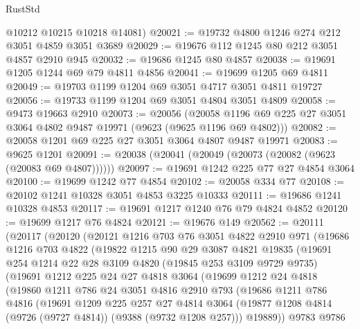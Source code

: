 \begin{lexlean}{RustStd}
\begin{coremodule}
      @10212
      @10215
      @10218
      @14081)
@20021 := @19732 @4800 @1246 @274 @212 @3051 @4859 @3051 @3689
@20029 := @19676 @112 @1245 @80 @212 @3051 @4857 @2910 @945
@20032 := @19686 @1245 @80 @4857
@20038 := @19691 @1205 @1244 @69 @79 @4811 @4856
@20041 := @19699 @1205 @69 @4811
@20049 := @19703 @1199 @1204 @69 @3051 @4717 @3051 @4811 @19727
@20056 := @19733 @1199 @1204 @69 @3051 @4804 @3051 @4809
@20058 := @9473 @19663 @2910
@20073 := @20056
    (@20058 @1196 @69 @225 @27 @3051 @3064 @4802 @9487 @19971 (@9623 (@9625 @1196 @69 @4802)))
@20082 := @20058 @1201 @69 @225 @27 @3051 @3064 @4807 @9487 @19971
@20083 := @9625 @1201
@20091 := @20038 (@20041 (@20049 (@20073 (@20082 (@9623 (@20083 @69 @4807))))))
@20097 := @19691 @1242 @225 @77 @27 @4854 @3064
@20100 := @19699 @1242 @77 @4854
@20102 := @20058 @334 @77
@20108 := @20102 @1241 @10328 @3051 @4853 @3225 @10333
@20111 := @19686 @1241 @10328 @4853
@20117 := @19691 @1217 @1240 @76 @79 @4824 @4852
@20120 := @19699 @1217 @76 @4824
@20121 := @19676 @149
@20562 := @20111
    (@20117
      (@20120
        (@20121
          @1216
          @703
          @76
          @3051
          @4822
          @2910
          @971
          (@19686
            @1216
            @703
            @4822
            (@19822
              @1215
              @90
              @29
              @3087
              @4821
              @19835
              (@19691
                @254
                @1214
                @22
                @28
                @3109
                @4820
                (@19845 @253 @3109 @9729 @9735)
                (@19691
                  @1212
                  @225
                  @24
                  @27
                  @4818
                  @3064
                  (@19699
                    @1212
                    @24
                    @4818
                    (@19860
                      @1211
                      @786
                      @24
                      @3051
                      @4816
                      @2910
                      @793
                      (@19686
                        @1211
                        @786
                        @4816
                        (@19691
                          @1209
                          @225
                          @257
                          @27
                          @4814
                          @3064
                          (@19877 @1208 @4814 (@9726 (@9727 @4814)) (@9388 (@9732 @1208 @257)))
                          @19889))
                      @9783
                      @9786

\end{coremodule}
\end{lexlean}
